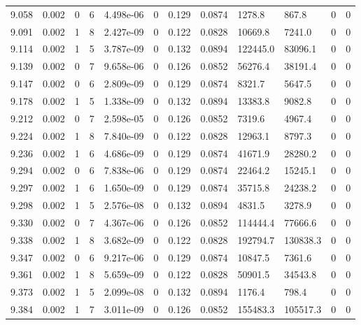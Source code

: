 \documentclass[preview]{standalone}
\begin{document}
{{{{{{{{{{{\begin{tabular}{L{1.2cm}C{1.2cm} C{0.3cm}C{0.5cm} C{1.4cm}C{1.4cm} C{1.4cm}C{1.4cm} C{1.6cm}C{1.6cm} C{1.6cm}C{1.6cm}}
  9.058  &  0.002  & 0     &  6 &  4.498e-06  & 0  &  0.129&   0.0874& 1278.8 & 867.8   &  0 & 0  \\ 
  9.091  &  0.002  & 1     &  8 &  2.427e-09  & 0  &  0.122&   0.0828& 10669.8 & 7241.0   &  0 & 0  \\ 
  9.114  &  0.002  & 1     &  5 &  3.787e-09  & 0  &  0.132&   0.0894& 122445.0 & 83096.1   &  0 & 0  \\ 
  9.139  &  0.002  & 0     &  7 &  9.658e-06  & 0  &  0.126&   0.0852& 56276.4 & 38191.4   &  0 & 0  \\ 
  9.147  &  0.002  & 0     &  6 &  2.809e-09  & 0  &  0.129&   0.0874& 8321.7 & 5647.5   &  0 & 0  \\ 
  9.178  &  0.002  & 1     &  5 &  1.338e-09  & 0  &  0.132&   0.0894& 13383.8 & 9082.8   &  0 & 0  \\ 
  9.212  &  0.002  & 0     &  7 &  2.598e-05  & 0  &  0.126&   0.0852& 7319.6 & 4967.4   &  0 & 0  \\ 
  9.224  &  0.002  & 1     &  8 &  7.840e-09  & 0  &  0.122&   0.0828& 12963.1 & 8797.3   &  0 & 0  \\ 
  9.236  &  0.002  & 1     &  6 &  4.686e-09  & 0  &  0.129&   0.0874& 41671.9 & 28280.2   &  0 & 0  \\ 
  9.294  &  0.002  & 0     &  6 &  7.838e-06  & 0  &  0.129&   0.0874& 22464.2 & 15245.1   &  0 & 0  \\ 
  9.297  &  0.002  & 1     &  6 &  1.650e-09  & 0  &  0.129&   0.0874& 35715.8 & 24238.2   &  0 & 0  \\ 
  9.298  &  0.002  & 1     &  5 &  2.576e-08  & 0  &  0.132&   0.0894& 4831.5 & 3278.9   &  0 & 0  \\ 
  9.330  &  0.002  & 0     &  7 &  4.367e-06  & 0  &  0.126&   0.0852& 114444.4 & 77666.6   &  0 & 0  \\ 
  9.338  &  0.002  & 1     &  8 &  3.682e-09  & 0  &  0.122&   0.0828& 192794.7 & 130838.3   &  0 & 0  \\ 
  9.347  &  0.002  & 0     &  6 &  9.217e-06  & 0  &  0.129&   0.0874& 10847.5 & 7361.6   &  0 & 0  \\ 
  9.361  &  0.002  & 1     &  8 &  5.659e-09  & 0  &  0.122&   0.0828& 50901.5 & 34543.8   &  0 & 0  \\ 
  9.373  &  0.002  & 1     &  5 &  2.099e-08  & 0  &  0.132&   0.0894& 1176.4 & 798.4   &  0 & 0  \\ 
  9.384  &  0.002  & 1     &  7 &  3.011e-09  & 0  &  0.126&   0.0852& 155483.3 & 105517.3   &  0 & 0  \\ 

\end{tabular}}}}}}}}}}}}
\end{document}
